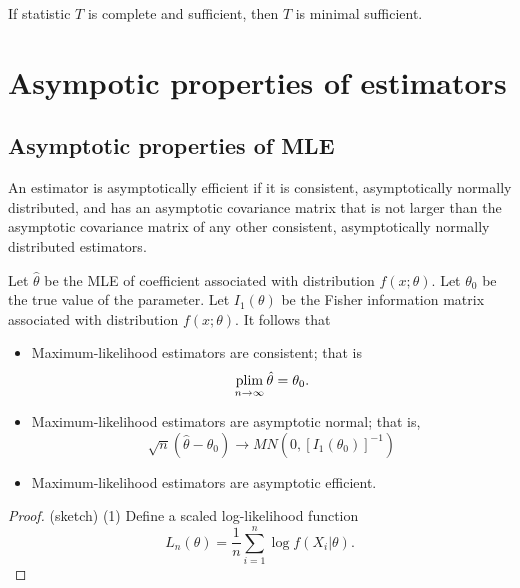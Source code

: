 \begin{refsection}
\begin{definition}\cite[48]{keener2010theoretical}
\end{definition}

\begin{theorem}\cite[49]{keener2010theoretical}
	If statistic $T$ is complete and sufficient, then $T$ is minimal sufficient. 
\end{theorem}


\section{Asympotic properties of estimators}





\subsection{Asymptotic properties of MLE}

\begin{definition}\cite[542]{greene2017econometric}
	An estimator is asymptotically efficient if it is consistent, asymptotically normally distributed, and has an asymptotic covariance matrix that is not larger than the asymptotic covariance matrix of any other consistent, asymptotically normally distributed estimators.	
\end{definition}

\begin{theorem}\cite[553]{moon2000mathematical}\cite[478]{greene2017econometric}\label{ch:theory-of-statistics:th:asymptoticPropertiesMLE} Let $\hat{\theta}$ be the MLE of coefficient associated with distribution $f(x;\theta)$. Let $\theta_0$ be the true value of the parameter. Let $I_1(\theta)$ be the Fisher information matrix associated with distribution $f(x;\theta)$. It follows that
\begin{itemize}
	\item Maximum-likelihood estimators are consistent; that is
	$$\operatorname*{plim}_{n\to \infty} \hat{\theta} = \theta_0.$$
	\item Maximum-likelihood estimators are asymptotic normal; that is,
	$$\sqrt{n}(\hat{\theta} - \theta_0) \to MN(0, [I_1(\theta_0)]^{-1})$$
	\item Maximum-likelihood estimators are asymptotic efficient.
\end{itemize}
\end{theorem}
\begin{proof}
(sketch) 
(1) Define a scaled log-likelihood function 
$$L_n(\theta) = \frac{1}{n}\sum_{i=1}^n \log f(X_i|\theta).$$



\end{proof}
\end{refsection}
